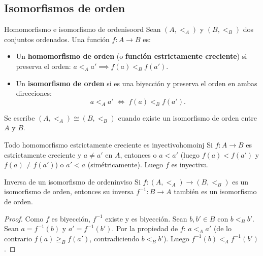 \subsection{Isomorfismos de orden}

\begin{definicion}{Homomorfismo e isomorfismo de orden}{isoord}
Sean $(A, <_A)$ y $(B, <_B)$ dos conjuntos ordenados. Una función $f: A \to B$ es:
\begin{itemize}[leftmargin=2em]
  \item Un \textbf{homomorfismo de orden} (o \textbf{función estrictamente creciente}) si preserva el orden: $a <_A a' \implies f(a) <_B f(a')$.
  \item Un \textbf{isomorfismo de orden} si es una biyección y preserva el orden en ambas direcciones:
  \[
    a <_A a' \;\iff\; f(a) <_B f(a').
  \]
\end{itemize}
Se escribe $(A, <_A) \cong (B, <_B)$ cuando existe un isomorfismo de orden entre $A$ y $B$.
\end{definicion}

\begin{observacion}{Todo homomorfismo estrictamente creciente es inyectivo}{homoinj}
Si $f: A \to B$ es estrictamente creciente y $a \neq a'$ en $A$, entonces o $a < a'$ (luego $f(a) < f(a')$ y $f(a) \neq f(a')$) o $a' < a$ (simétricamente). Luego $f$ es inyectiva.
\end{observacion}

\begin{proposicion}{Inversa de un isomorfismo de orden}{inviso}
Si $f: (A, <_A) \to (B, <_B)$ es un isomorfismo de orden, entonces su inversa $f^{-1}: B \to A$ también es un isomorfismo de orden.
\end{proposicion}

\begin{proof}
Como $f$ es biyección, $f^{-1}$ existe y es biyección. Sean $b, b' \in B$ con $b <_B b'$. Sean $a = f^{-1}(b)$ y $a' = f^{-1}(b')$. Por la propiedad de $f$: $a <_A a'$ (de lo contrario $f(a) \geq_B f(a')$, contradiciendo $b <_B b'$). Luego $f^{-1}(b) <_A f^{-1}(b')$.
\end{proof}

